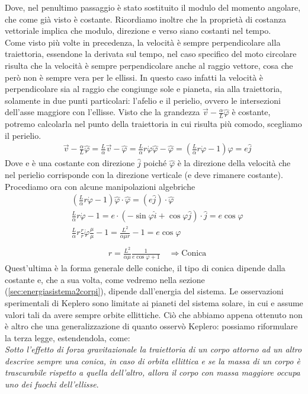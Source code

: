 Dove, nel penultimo passaggio è stato sostituito il modulo del momento angolare, che come già visto è costante. Ricordiamo inoltre che la proprietà di costanza vettoriale implica che modulo, direzione e verso siano costanti nel tempo.\\
Come visto più volte in precedenza, la velocità è sempre perpendicolare alla traiettoria, essendone la derivata sul tempo, nel caso specifico del moto circolare risulta che la velocità è sempre perpendicolare anche al raggio vettore, cosa che però non è sempre vera per le ellissi. In questo caso infatti la velocità è perpendicolare sia al raggio che congiunge sole e pianeta, sia alla traiettoria, solamente in due punti particolari: l'afelio e il perielio, ovvero le intersezioni dell'asse maggiore con l'ellisse. Visto che la grandezza $\vec{v}-\frac{\alpha}{L}\hat{\varphi}$ è costante, potremo calcolarla nel punto della traiettoria in cui risulta più comodo, scegliamo il perielio. 
\begin{align*}
	&\vec{v}-\frac{\alpha}{L}\hat{\varphi} = \frac{L}{\alpha}\vec{v}-\hat{\varphi} = \frac{L}{\alpha}r\dot{\varphi} \hat{\varphi}-\hat{\varphi}= (\frac{L}{\alpha}r\dot{\varphi} -1)\hat{\varphi} = e\hat{j}
\end{align*}
Dove e è una costante con direzione $\hat{j}$ poiché $\hat{\varphi}$ è la direzione della velocità che nel perielio corrisponde con la direzione verticale (e deve rimanere costante). Procediamo ora con alcune manipolazioni algebriche
\begin{align*}
&(\frac{L}{\alpha}r\dot{\varphi} -1)\hat{\varphi}\cdot \hat{\varphi} = (e\hat{j})\cdot\hat{\varphi}\\
&\frac{L}{\alpha}r\dot{\varphi} -1 = e \cdot (-\sin\varphi\hat{i}+\cos\varphi\hat{j})\cdot\hat{j}= e \cos\varphi\\
&\frac{L}{\alpha} r \frac{r}{r} \dot{\varphi} \frac{\mu}{\mu} - 1 = \frac{L^2}{\alpha \mu r}-1 = e \cos\varphi\\
\end{align*}
\begin{align}\label{eq:conica}
	&r = \frac{L^2}{\alpha\mu}\frac{1}{e\cos\varphi+1}\quad \Rightarrow \text{Conica}
\end{align}
Quest'ultima è la forma generale delle coniche, il tipo di conica dipende dalla costante e, che a sua volta, come vedremo nella sezione (\ref{sec:energiasistema2corpi}), dipende dall'energia del sistema. Le osservazioni sperimentali di Keplero sono limitate ai pianeti del sistema solare, in cui e assume valori tali da avere sempre orbite ellittiche. Ciò che abbiamo appena ottenuto non è altro che una generalizzazione di quanto osservò Keplero: possiamo riformulare la terza legge, estendendola, come:\\
\textit{Sotto l'effetto di forza gravitazionale la traiettoria di un corpo attorno ad un altro descrive sempre una conica, in caso di orbita ellittica e se la massa di un corpo è trascurabile rispetto a quella dell'altro, allora il corpo con massa maggiore occupa uno dei fuochi dell'ellisse}.
